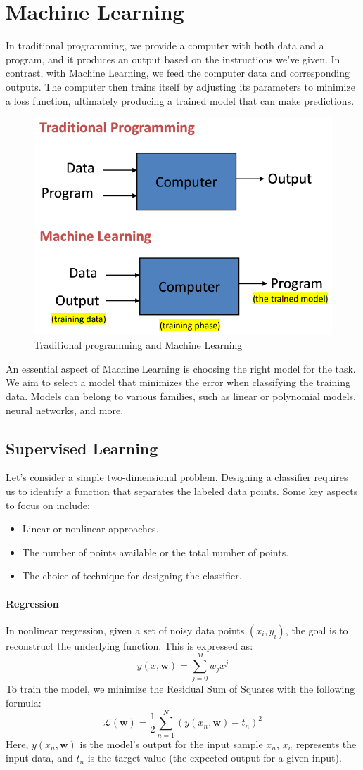 \section{Machine Learning}

In traditional programming, we provide a computer with both data and a program, and it produces an output based on the instructions we've given. 
In contrast, with Machine Learning, we feed the computer data and corresponding outputs. 
The computer then trains itself by adjusting its parameters to minimize a loss function, ultimately producing a trained model that can make predictions.
\begin{figure}[H]
    \centering
    \includegraphics[width=0.4\linewidth]{images/eeai6.png}
    \caption{Traditional programming and Machine Learning}
\end{figure}
\noindent An essential aspect of Machine Learning is choosing the right model for the task. 
We aim to select a model that minimizes the error when classifying the training data. 
Models can belong to various families, such as linear or polynomial models, neural networks, and more.

\subsection{Supervised Learning}
Let's consider a simple two-dimensional problem. 
Designing a classifier requires us to identify a function that separates the labeled data points. 
Some key aspects to focus on include:
\begin{itemize}
    \item Linear or nonlinear approaches. 
    \item The number of points available or the total number of points. 
    \item The choice of technique for designing the classifier.
\end{itemize}

\paragraph*{Regression}
In nonlinear regression, given a set of noisy data points $(x_i,y_i)$, the goal is to reconstruct the underlying function. 
This is expressed as:
\[y(x,\mathbf{w})=\sum_{j=0}^{M}w_jx^j\]
\noindent To train the model, we minimize the Residual Sum of Squares with the following formula:
\[\mathcal{L}(\mathbf{w})=\dfrac{1}{2}\sum_{n=1}^N\left(y(x_n,\mathbf{w})-t_n\right)^2\]
Here, $y(x_n,\mathbf{w})$  is the model's output for the input sample $x_n$, $x_n$ represents the input data, and $t_n$ is the target value (the expected output for a given input).

